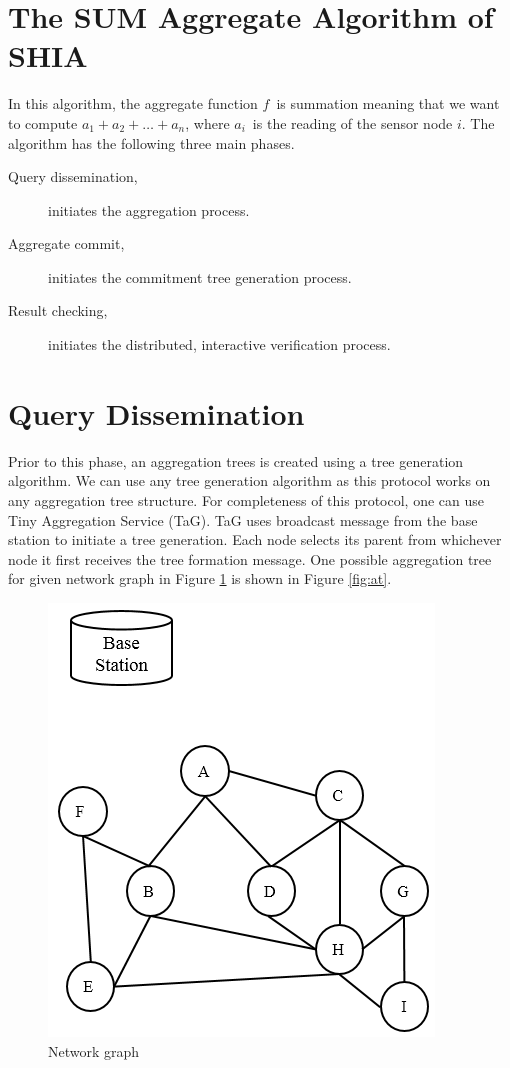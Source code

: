 \section{The SUM Aggregate Algorithm of SHIA}
		In this algorithm, the aggregate function $f$\ is summation meaning that we want to compute $a_{1} + a_{2} + \dotsc + a_{n}$, where $a_{i}$\ is the reading of the sensor node $i$.
		The algorithm has the following three main phases.
		\begin{description}
			\item [Query dissemination,] initiates the aggregation process.
			\item [Aggregate commit,] initiates the commitment tree generation process.
			\item [Result checking,] initiates the distributed, interactive verification process.
		\end{description}

\section{Query Dissemination}
	\label{sec:query-dissemination}
	Prior to this phase, an aggregation trees is created using a tree generation algorithm.
	We can use any tree generation algorithm as this protocol works on any aggregation tree structure.
	For completeness of this protocol, one can use Tiny Aggregation Service (TaG)\cite{madden2002tag}.
	TaG uses broadcast message from the base station to initiate a tree generation.
	Each node selects its parent from whichever node it first receives the tree formation message.
	One possible aggregation tree for given network graph in Figure \ref{fig:ng} is shown in Figure \ref{fig:at}. 
	\begin{figure}[h!]
		\centering
		\includegraphics[scale = 1]{images/network-graph.png}
		\caption{Network graph}
		\label{fig:ng}
	\end{figure}

